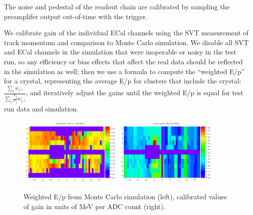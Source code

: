 The noise and pedestal of the readout chain are calibrated by sampling the preamplifer output out-of-time with the trigger.

We calibrate gain of the individual ECal channels using the SVT measurement of track momentum and comparison to Monte Carlo simulation. 
We disable all SVT and ECal channels in the simulation that were inoperable or noisy in the test run, so any efficiency or bias effects that affect the real data should be reflected in the simulation as well; then we use a formula to compute the ``weighted E/p'' for a crystal, representing the average E/p for clusters that include the crystal: $\frac{\sum_j w_{j,i}}{\sum_j\frac{P_j}{E_j}w_{j,i}}$, and iteratively adjust the gains until the weighted E/p is equal for test run data and simulation.

\begin{figure}[ht]
	\includegraphics[width=0.45\textwidth]{test2012/ecalperformance/ecalgainplots_corr_sim}
	\includegraphics[width=0.45\textwidth]{test2012/ecalperformance/gains}
	\caption{\small{Weighted E/p from Monte Carlo simulation (left), calibrated values of gain in units of MeV per ADC count (right).}}
	\label{fig:gains}
\end{figure}

